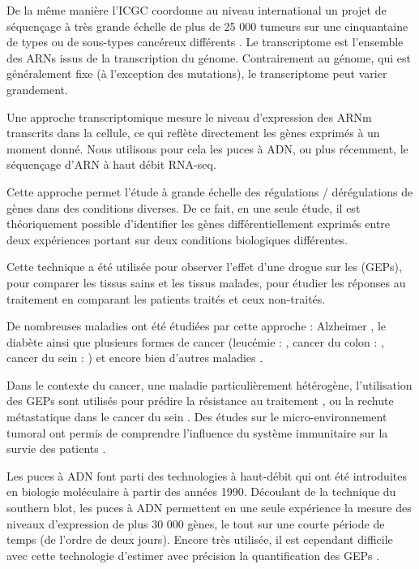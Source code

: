 			De la même manière l'\ac{ICGC} coordonne au niveau international un projet de séquençage à très grande échelle de plus de 25 000 tumeurs sur une cinquantaine de types ou de sous-types cancéreux différents \citep{ICGC2010}.
			Le transcriptome est l'ensemble des \acsp{ARN} issus de la transcription du génome.
			Contrairement au génome, qui est généralement fixe (à l'exception des mutations), le transcriptome peut varier grandement.

			Une approche transcriptomique mesure le niveau d'expression des \acs{ARNm} transcrits dans la cellule, ce qui reflète directement les gènes exprimés à un moment donné.
			Nous utilisons pour cela les puces à \acs{ADN}, ou plus récemment, le séquençage d'\acs{ARN} à haut débit \acs{RNA}-seq.

			Cette approche permet l'étude à grande échelle des régulations / dérégulations de gènes dans des conditions diverses.
			De ce fait, en une seule étude, il est théoriquement possible d'identifier les gènes différentiellement exprimés entre deux expériences portant sur deux conditions biologiques différentes.

			Cette technique a été utilisée pour observer l'effet d'une drogue sur les (\acp{GEP}), pour comparer les tissus sains et les tissus malades, pour étudier les réponses au traitement en comparant les patients traités et ceux non-traités.

			De nombreuses maladies ont été étudiées par cette approche : Alzheimer \citep{Ricciarelli2004}, le diabète \citep{Kaestner2003} ainsi que plusieurs formes de cancer (leucémie : \citet{Golub1999}, cancer du colon : \citet{Li2001}, cancer du sein : \citet{Wang2005}) et encore bien d'autres maladies \citep{Munro2009}.

			Dans le contexte du cancer, une maladie particulièrement hétérogène, l'utilisation des \acp{GEP} sont utilisés pour prédire la résistance au traitement \citep{DeLavallade2010}, ou la rechute métastatique dans le cancer du sein \citep{vandevijver2002}.
			Des études sur le micro-environnement tumoral ont permis de comprendre l'influence du système immunitaire sur la survie des patients \citep{Pages2010}.

			Les puces à \acs{ADN} font parti des technologies à haut-débit qui ont été introduites en biologie moléculaire à partir des années 1990.
			Découlant de la technique du southern blot, les puces à \acs{ADN} permettent en une seule expérience la mesure des niveaux d'expression de plus 30 000 gènes, le tout sur une courte période de temps (de l'ordre de deux jours).
			Encore très utilisée, il est cependant difficile avec cette technologie d'estimer avec précision la quantification des \acp{GEP} \citep{Heller2002, Hardiman2004, Wang2005b, Zakharkin2005, Draghici2006}.

